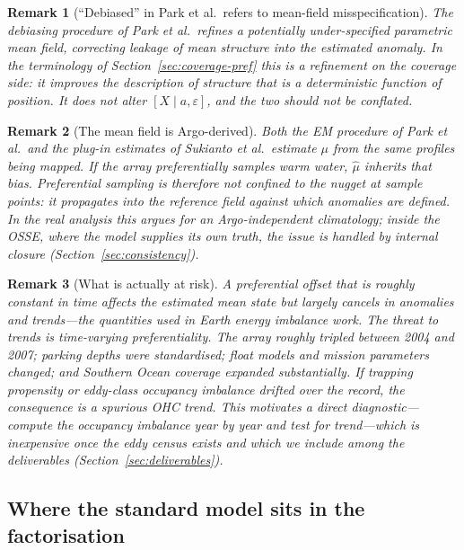 \documentclass[11pt]{article}
\newtheorem{remark}{Remark}
\begin{document}
\begin{remark}[``Debiased'' in Park et al.\ refers to mean-field misspecification]
\label{rem:debias}
The debiasing procedure of Park et al.\ refines a potentially under-specified parametric mean
field, correcting leakage of mean structure into the estimated anomaly. In the terminology of
Section~\ref{sec:coverage-pref} this is a refinement on the \emph{coverage} side: it improves
the description of structure that is a deterministic function of position. It does not alter
$[X \mid a, \varepsilon]$, and the two should not be conflated.
\end{remark}

\begin{remark}[The mean field is Argo-derived]
\label{rem:circular}
Both the EM procedure of Park et al.\ and the plug-in estimates of Sukianto et al.\ estimate
$\mu$ from the same profiles being mapped. If the array preferentially samples warm water,
$\hat\mu$ inherits that bias. Preferential sampling is therefore not confined to the nugget at
sample points: it propagates into the reference field against which anomalies are defined. In
the real analysis this argues for an Argo-independent climatology; inside the OSSE, where the
model supplies its own truth, the issue is handled by internal closure
(Section~\ref{sec:consistency}).
\end{remark}

\begin{remark}[What is actually at risk]
\label{rem:trend}
A preferential offset that is roughly constant in time affects the estimated mean state but
largely cancels in anomalies and trends---the quantities used in Earth energy imbalance work.
The threat to trends is \emph{time-varying} preferentiality. The array roughly tripled between
2004 and 2007; parking depths were standardised; float models and mission parameters changed;
and Southern Ocean coverage expanded substantially. If trapping propensity or eddy-class
occupancy imbalance drifted over the record, the consequence is a spurious OHC trend. This
motivates a direct diagnostic---compute the occupancy imbalance year by year and test for
trend---which is inexpensive once the eddy census exists and which we include among the
deliverables (Section~\ref{sec:deliverables}).
\end{remark}

\subsection{Where the standard model sits in the factorisation}
\label{sec:compatible}
\end{document}
